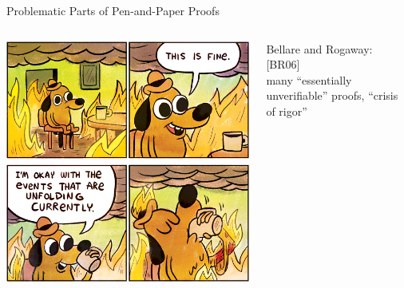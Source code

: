 \begin{frame}{Problematic Parts of Pen-and-Paper Proofs}
\hypertarget{problematic-proofs}{}
  \begin{columns}[fullwidth,c]
    \begin{column}{.3\linewidth}
      \includegraphics[width=\linewidth]{graphics/this-is-fine-crop.png}\\
    \end{column}
    \hspace{1.2em}
    \begin{column}{.68\linewidth}

      Bellare and Rogaway: [BR06]\\
      \hspace{1.618em} many “essentially unverifiable” proofs, “crisis of rigor”\\[1.5em]


\end{column}
\end{columns}
\end{frame}
